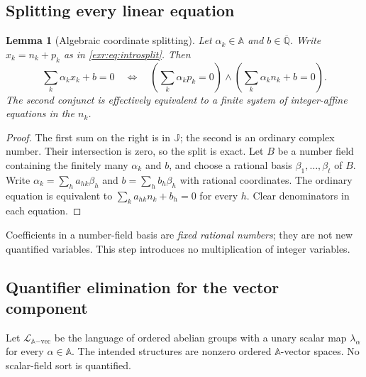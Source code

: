 \documentclass[11pt,letterpaper]{article}
\numberwithin{equation}{section}
\newtheorem{lemma}[lemma]{Lemma}
\theoremstyle{definition}
\theoremstyle{remark}
\newcommand{\A}{\mathbb A}
\newcommand{\Qb}{\overline{\mathbb Q}}
\newcommand{\J}{\mathbb J}
\newcommand{\Lvec}{\mathcal L_{\A\mathrm{-vec}}}
\begin{document}
\subsection{Splitting every linear equation}
\begin{lemma}[Algebraic coordinate splitting]\label{exr:lem:split}
Let $\alpha_k\in\A$ and $b\in\Qb$. Write $x_k=n_k+p_k$ as in
\eqref{exr:eq:introsplit}. Then
\begin{equation}\label{exr:eq:splitlinear}
 \sum_k\alpha_kx_k+b=0
 \quad\Longleftrightarrow\quad
 \left(\sum_k\alpha_kp_k=0\right)
 \land\left(\sum_k\alpha_kn_k+b=0\right).
\end{equation}
The second conjunct is effectively equivalent to a finite system of integer-affine
equations in the $n_k$.
\end{lemma}
\begin{proof}
The first sum on the right is in $\J$; the second is an ordinary complex number.
Their intersection is zero, so the split is exact. Let $B$ be a number field
containing the finitely many $\alpha_k$ and $b$, and choose a rational basis
$\beta_1,\ldots,\beta_t$ of $B$. Write
$\alpha_k=\sum_h a_{hk}\beta_h$ and $b=\sum_h b_h\beta_h$ with rational
coordinates. The ordinary equation is equivalent to
$\sum_k a_{hk}n_k+b_h=0$ for every $h$. Clear denominators in each equation.
\end{proof}

Coefficients in a number-field basis are \emph{fixed rational numbers}; they are
not new quantified variables. This step introduces no multiplication of integer
variables.

\subsection{Quantifier elimination for the vector component}
Let $\Lvec$ be the language of ordered abelian groups with a unary scalar map
$\lambda_\alpha$ for every $\alpha\in\A$. The intended structures are nonzero
ordered $\A$-vector spaces. No scalar-field sort is quantified.
\end{document}
